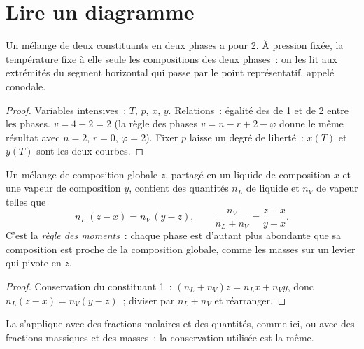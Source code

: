 \section{Lire un diagramme}

\begin{proposition}\label{prop:b2:liquid-vapour-diagrams:variance}
Un mélange de deux constituants en deux phases a pour  2. À pression fixée,
la température fixe à elle seule les compositions des deux phases~: on les lit
aux extrémités du segment horizontal qui passe par le point représentatif,
appelé conodale.
\end{proposition}

\begin{proof}
Variables intensives~: $T$, $p$, $x$, $y$. Relations~: égalité des  de 1 et de 2 entre les phases. $v = 4 - 2 = 2$ (la règle des phases
$v = n - r + 2 - \varphi$ donne le même résultat avec $n = 2$, $r = 0$, $\varphi = 2$).
Fixer $p$ laisse un degré de liberté~: $x(T)$ et $y(T)$ sont les deux courbes.
\end{proof}

\begin{theorem}\label{thm:b2:liquid-vapour-diagrams:lever}
Un mélange de composition globale $z$, partagé en un liquide de composition $x$
et une vapeur de composition $y$, contient des quantités $n_L$ de liquide et $n_V$ de
vapeur telles que
\[
  n_L\,(z - x) = n_V\,(y - z), \qquad \frac{n_V}{n_L + n_V} = \frac{z - x}{y - x} .
\]
C'est la \emph{règle des moments}~: chaque phase est d'autant plus
abondante que sa composition est proche de la composition globale, comme les masses sur
un levier qui pivote en $z$.
\end{theorem}

\begin{proof}
Conservation du constituant 1~: $(n_L + n_V)z = n_Lx + n_Vy$, donc $n_L(z - x) =
n_V(y - z)$~; diviser par $n_L + n_V$ et réarranger.
\end{proof}

La  s'applique avec des fractions molaires et des quantités, comme ici, ou avec des
fractions massiques et des masses~: la conservation utilisée est la même.

